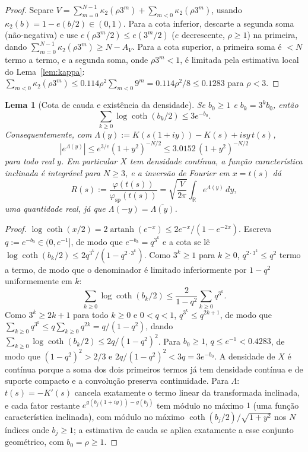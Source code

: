 \documentclass[11pt]{amsart}
\theoremstyle{plain}
\newtheorem{lemma}[theorem]{Lema}
\theoremstyle{definition}
\theoremstyle{remark}
\DeclareMathOperator{\artanh}{artanh}
\newcommand{\R}{\mathbb{R}}
\begin{document}
\begin{proof}
Separe $V = \sum_{m=0}^{N-1}\kappa_2(\rho3^m) + \sum_{m<0}\kappa_2(\rho3^m)$, usando $\kappa_2(b) =
1-e(b/2) \in (0,1)$. Para a cota inferior, descarte a segunda soma (não-negativa) e use
$e(\rho3^m/2) \le e(3^m/2)$ ($e$ decrescente, $\rho\ge1$) na primeira, dando
$\sum_{m=0}^{N-1}\kappa_2(\rho3^m) \ge N - A_V$. Para a cota superior, a primeira soma é $<N$ termo
a termo, e a segunda soma, onde $\rho3^m<1$, é limitada pela estimativa local do Lema~\ref{lem:kappa}:
$\sum_{m<0}\kappa_2(\rho3^m) \le 0.114\rho^2\sum_{m<0}9^m = 0.114\rho^2/8 \le 0.1283$ para $\rho<3$.
\end{proof}

\begin{lemma}[Cota de cauda e existência da densidade]
\label{lem:tail}
Se $b_0\ge1$ e $b_k=3^kb_0$, então
\[
\sum_{k\ge0}\log\coth(b_k/2) \le 3e^{-b_0}.
\]
Consequentemente, com $\Lambda(y) := K(s(1+iy)) - K(s) + isy\,t(s)$,
\[
|e^{\Lambda(y)}| \le e^{3/e}(1+y^2)^{-N/2} \le 3.0152\,(1+y^2)^{-N/2}
\]
para todo real $y$. Em particular $X$ tem densidade contínua, a função característica inclinada é
integrável para $N\ge3$, e a inversão de Fourier em $x=t(s)$ dá
\begin{equation}
\label{eq:R}
R(s) := \frac{\varphi(t(s))}{\varphi_{\mathrm{sp}}(t(s))} = \sqrt{\frac{V}{2\pi}}\int_\R e^{\Lambda(y)}\,dy,
\end{equation}
uma quantidade real, já que $\Lambda(-y) = \overline{\Lambda(y)}$.
\end{lemma}

\begin{proof}
$\log\coth(x/2) = 2\artanh(e^{-x}) \le 2e^{-x}/(1-e^{-2x})$. Escreva $q:=e^{-b_0}\in(0,e^{-1}]$, de
modo que $e^{-b_k}=q^{3^k}$ e a cota se lê $\log\coth(b_k/2) \le 2q^{3^k}/(1-q^{2\cdot3^k})$. Como
$3^k\ge1$ para $k\ge0$, $q^{2\cdot3^k}\le q^2$ termo a termo, de modo que o denominador é limitado
inferiormente por $1-q^2$ uniformemente em $k$:
\[
\sum_{k\ge0}\log\coth(b_k/2) \le \frac{2}{1-q^2}\sum_{k\ge0}q^{3^k}.
\]
Como $3^k\ge2k+1$ para todo $k\ge0$ e $0<q<1$, $q^{3^k}\le q^{2k+1}$, de modo que
$\sum_{k\ge0}q^{3^k} \le q\sum_{k\ge0}q^{2k} = q/(1-q^2)$, dando
$\sum_{k\ge0}\log\coth(b_k/2) \le 2q/(1-q^2)^2$. Para $b_0\ge1$, $q\le e^{-1}<0.4283$, de modo que
$(1-q^2)^2>2/3$ e $2q/(1-q^2)^2<3q=3e^{-b_0}$.
A densidade de $X$ é contínua porque a soma dos dois primeiros termos já tem densidade contínua e
de suporte compacto e a convolução preserva continuidade. Para $\Lambda$: $t(s) = -K'(s)$ cancela
exatamente o termo linear da transformada inclinada, e cada fator restante
$e^{g(b_j(1+iy))-g(b_j)}$ tem módulo no máximo $1$ (uma função característica inclinada), com módulo
no máximo $\coth(b_j/2)/\sqrt{1+y^2}$ nos $N$ índices onde $b_j\ge1$; a estimativa de cauda se aplica
exatamente a esse conjunto geométrico, com $b_0=\rho\ge1$.
\end{proof}
\end{document}

